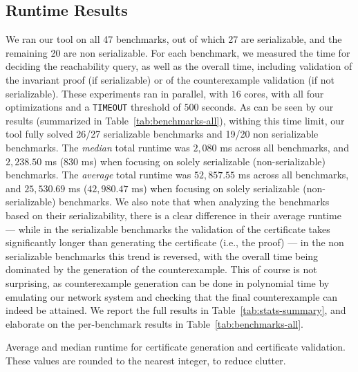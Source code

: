 \subsection{Runtime Results}
We ran our tool on all 47 benchmarks, out of which 27 are serializable, and the remaining 20 are non serializable. 
For each benchmark, we measured the time for deciding the reachability query, as well as the overall time, including validation of the invariant proof (if serializable) or of the counterexample validation (if not serializable). These experiments ran in parallel, with $16$ cores, with all four optimizations and a \texttt{TIMEOUT} threshold of $500$ seconds. As can be seen by our results (summarized in Table~\ref{tab:benchmarks-all}), withing this time limit, our tool fully solved 26/27 serializable benchmarks 
and 19/20 non serializable benchmarks. 
%
The \textit{median} total runtime was $2{,}080$ ms across all benchmarks, and $2{,}238.50$ ms ($830$ ms) when focusing on solely serializable (non-serializable) benchmarks.
%
The \textit{average} total runtime was $52{,}857.55$ ms across all benchmarks, and $25{,}530.69$ ms ($42{,}980.47$ ms) when focusing on solely serializable (non-serializable) benchmarks.
%
We also note that when analyzing the benchmarks based on their serializability, there is a clear difference in their average runtime --- while in the serializable benchmarks the validation of the certificate takes significantly longer than generating the certificate (i.e., the proof) --- in the non serializable benchmarks this trend is reversed, with the overall time being dominated by the generation of the counterexample. This of course is not surprising, as counterexample generation can be done in polynomial time by emulating our network system and checking that the final counterexample can indeed be attained.
%
We report the full results in Table~\ref{tab:stats-summary}, and elaborate on the per-benchmark results in Table~\ref{tab:benchmarks-all}.





\begin{table}[H]
	\centering
	
\caption{Average and median runtime for certificate generation and certificate validation. These values are rounded to the nearest integer, to reduce clutter.}
\label{tab:stats-summary}
\end{table}






